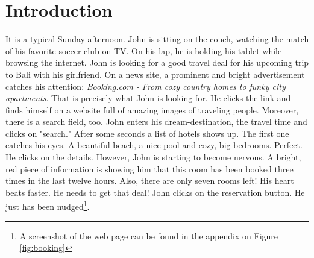 \section{Introduction}
It is a typical Sunday afternoon. John is sitting on the couch, watching the match of his favorite soccer club on TV. On his lap, he is holding his tablet while browsing the internet. John is looking for a good travel deal for his upcoming trip to Bali with his girlfriend. On a news site, a prominent and bright advertisement catches his attention: \textit{Booking.com - From cozy country homes to funky city apartments}. That is precisely what John is looking for. He clicks the link and finds himself on a website full of amazing images of traveling people. Moreover, there is a search field, too. John enters his dream-destination, the travel time and clicks on "search." After some seconds a list of hotels shows up. The first one catches his eyes. A beautiful beach, a nice pool and cozy, big bedrooms. Perfect. He clicks on the details. However,  John is starting to become nervous. A bright, red piece of information is showing him that this room has been booked three times in the last twelve hours. Also, there are only seven rooms left! His heart beats faster. He needs to get that deal! John clicks on the reservation button. He just has been nudged\footnote{A screenshot of the web page can be found in the appendix on Figure \ref{fig:booking}}.
\\

